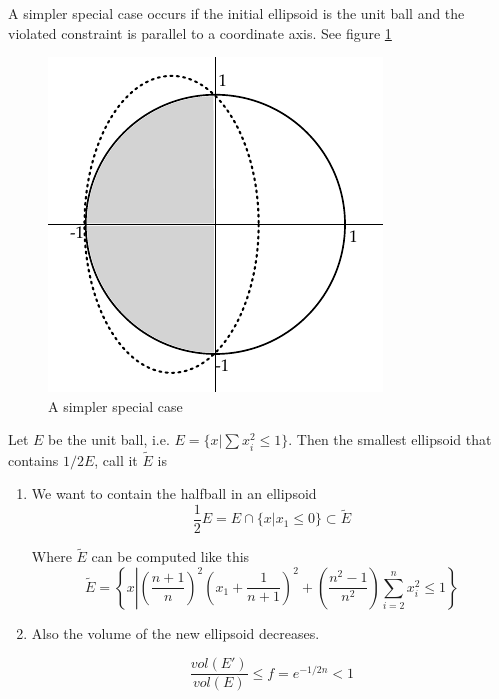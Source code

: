 A simpler special case occurs if the initial ellipsoid is the unit ball and the violated constraint is parallel to a coordinate axis. See figure \ref{Fig:ellipsoidStart}

\begin{figure}[hbt]
\begin{center}
\includegraphics{./images/ellipsoidStart}
\end{center}
\caption{A simpler special case}
\label{Fig:ellipsoidStart}
\end{figure}

\begin{lem} Let $E$ be the unit ball, i.e. $E=\{x|\sum x_i^2\leq 1\}$. Then the smallest ellipsoid that contains $1/2E$, call it $\tilde E$ is

\begin{enumerate}
\item  We want to contain the halfball in an ellipsoid
\[\frac{1}{2}E=E\cap \{x|x_1\leq 0\} \subset \tilde E\]

Where $\tilde E$ can be computed like this
\[\tilde E = \left\{x\left|\left(\frac{n+1}{n}\right)^2\left(x_1+\frac{1}{n+1}\right)^2+\left(\frac{n^2-1}{n^2}\right) \sum_{i=2}^n x_i^2 \leq 1\right.\right\}\]
\item Also the volume of the new ellipsoid decreases.

\[\frac{vol(E')}{vol(E)}\leq f = e^{-1/2n}<1\]
\end{enumerate}
\end{lem}

